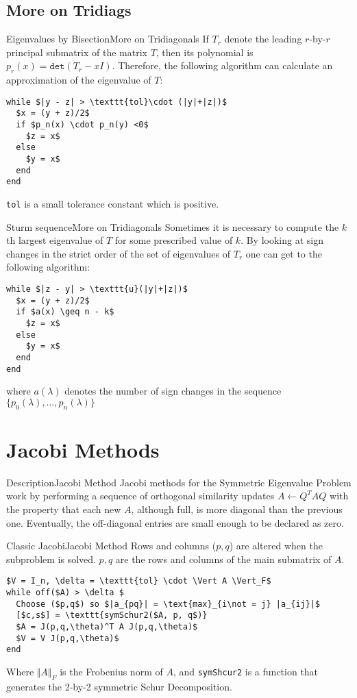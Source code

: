 \documentclass{beamer}
\begin{document}
\subsection{More on Tridiags}

\begin{frame}[fragile]{Eigenvalues by Bisection}{More on Tridiagonals}
If $T_r$ denote the leading $r$-by-$r$ principal submatrix of the matrix $T$, then its polynomial is $p_r(x) = \texttt{det}(T_r - xI)$.
\pause
Therefore, the following algorithm can calculate an approximation of the eigenvalue of $T$:
\begin{lstlisting}[mathescape=true]
while $|y - z| > \texttt{tol}\cdot (|y|+|z|)$
  $x = (y + z)/2$
  if $p_n(x) \cdot p_n(y) <0$
    $z = x$
  else
    $y = x$
  end
end
\end{lstlisting}
\texttt{tol} is a small tolerance constant which is positive.
\end{frame}

\begin{frame}[fragile]{Sturm sequence}{More on Tridiagonals}
Sometimes it is necessary to compute the $k$th largest eigenvalue of $T$
for some prescribed value of $k$.
By looking at sign changes in the strict order of the set of eigenvalues of $T_r$ one can get to the following algorithm:

\begin{lstlisting}[mathescape=true]
while $|z - y| > \texttt{u}(|y|+|z|)$
  $x = (y + z)/2$
  if $a(x) \geq n - k$
    $z = x$
  else
    $y = x$
  end
end
\end{lstlisting}
where $a(\lambda)$ denotes the number of sign changes in the sequence $\{p_0(\lambda),\dots, p_n(\lambda)\}$
\end{frame}

\section{Jacobi Methods}
\begin{frame}{Description}{Jacobi Method}
Jacobi methods for the Symmetric Eigenvalue Problem work by performing a sequence of orthogonal similarity updates $A \leftarrow Q^T A Q$ with the property that each new $A$, although full, is more diagonal than the previous one.
Eventually, the off-diagonal entries are small enough to be declared as zero.
\end{frame}

\begin{frame}[fragile]{Classic Jacobi}{Jacobi Method}
Rows and columns ($p,q$) are altered when the subproblem is solved. $p,q$ are the rows and columns of the main submatrix  of $A$.
\pause
\begin{lstlisting}[mathescape=true]
$V = I_n, \delta = \texttt{tol} \cdot \Vert A \Vert_F$
while off($A) > \delta $
  Choose ($p,q$) so $|a_{pq}| = \text{max}_{i\not = j} |a_{ij}|$
  [$c,s$] = \texttt{symSchur2($A, p, q$)}
  $A = J(p,q,\theta)^T A J(p,q,\theta)$
  $V = V J(p,q,\theta)$
end
\end{lstlisting}
Where $\Vert A \Vert_F$ is the Frobenius norm of $A$, and \texttt{symShcur2} is a function that generates the 2-by-2 symmetric Schur Decomposition.
\end{frame}
\end{document}
